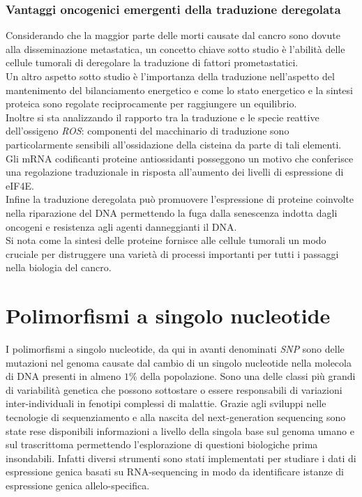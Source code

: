 		
		\subsubsection{Vantaggi oncogenici emergenti della traduzione deregolata}
		Considerando che la maggior parte delle morti causate dal cancro sono dovute alla disseminazione metastatica, un concetto chiave sotto studio \`e l'abilit\`a delle cellule tumorali di deregolare la traduzione di fattori prometastatici.\\
		Un altro aspetto sotto studio \`e l'importanza della traduzione nell'aspetto del mantenimento del bilanciamento energetico e come lo stato energetico e la sintesi proteica sono regolate reciprocamente per raggiungere un equilibrio.\\
		Inoltre si sta analizzando il rapporto tra la traduzione e le specie reattive dell'ossigeno \emph{ROS}: componenti del macchinario di traduzione sono particolarmente sensibili all'ossidazione della cisteina da parte di tali elementi.
		Gli mRNA codificanti proteine antiossidanti posseggono un motivo che conferisce una regolazione traduzionale in risposta all'aumento dei livelli di espressione di eIF4E.\\
		Infine la traduzione deregolata pu\`o promuovere l'espressione di proteine coinvolte nella riparazione del DNA permettendo la fuga dalla senescenza indotta dagli oncogeni e resistenza agli agenti danneggianti il DNA.\\
		Si nota come la sintesi delle proteine fornisce alle cellule tumorali un modo cruciale per distruggere una variet\`a di processi importanti per tutti i passaggi nella biologia del cancro.


\section{Polimorfismi a singolo nucleotide}
I polimorfismi a singolo nucleotide, da qui in avanti denominati \emph{SNP} sono delle mutazioni nel genoma causate dal cambio di un singolo nucleotide nella molecola di DNA presenti in almeno $1\%$ della popolazione.
Sono una delle classi pi\`u grandi di variabilit\`a genetica che possono sottostare o essere responsabili di variazioni inter-individuali in fenotipi complessi di malattie.
Grazie agli sviluppi nelle tecnologie di sequenziamento e alla nascita del next-generation sequencing sono state rese disponibili informazioni a livello della singola base sul genoma umano e sul trascrittoma permettendo l'esplorazione di questioni biologiche prima insondabili.
Infatti diversi strumenti sono stati implementati per studiare i dati di espressione genica basati su RNA-sequencing in modo da identificare istanze di espressione genica allelo-specifica.

